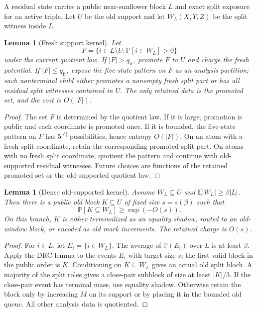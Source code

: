 \documentclass[11pt]{article}
\newtheorem{lemma}[theorem]{Lemma}
\theoremstyle{remark}
\newcommand{\E}{\mathbb E}
\newcommand{\Prob}{\mathbb P}
\newcommand{\fr}{\mathrm{fr}}
\begin{document}
A residual state carries a public near-sunflower block $L$ and exact split exposure for an active triple.  Let $U$ be the old support and let $W_L(X,Y,Z)$ be the split witness inside $L$.

\begin{lemma}[Fresh support kernel]\label{lem:appendix-fresh-kernel}
Let
\[
        F=\{i\in L\setminus U:\Prob[i\in W_L]>0\}
\]
under the current quotient law.  If $|F|>q_{\fr}$, promote $F$ to $U$ and charge the fresh potential.  If $|F|\le q_{\fr}$, expose the five-state pattern on $F$ as an analysis partition; each nonterminal child either promotes a nonempty fresh split part or has all residual split witnesses contained in $U$.  The only retained data is the promoted set, and the cost is $O(|F|)$.
\end{lemma}

\begin{proof}
The set $F$ is determined by the quotient law.  If it is large, promotion is public and each coordinate is promoted once.  If it is bounded, the five-state pattern on $F$ has $5^{|F|}$ possibilities, hence entropy $O(|F|)$.  On an atom with a fresh split coordinate, retain the corresponding promoted split part.  On atoms with no fresh split coordinate, quotient the pattern and continue with old-supported residual witnesses.  Future choices are functions of the retained promoted set or the old-supported quotient law.
\end{proof}

\begin{lemma}[Dense old-supported kernel]\label{lem:appendix-dense-old}
Assume $W_L\subseteq U$ and $\E|W_L|\ge \beta |L|$.  Then there is a public old block $K\subseteq U$ of fixed size $s=s(\beta)$ such that
\[
        \Prob[K\subseteq W_L]\ge \exp(-O(s)).
\]
On this branch, $K$ is either terminalized as an equality shadow, routed to an old-window block, or encoded as old mark increments.  The retained charge is $O(s)$.
\end{lemma}

\begin{proof}
For $i\in L$, let $E_i=\{i\in W_L\}$.  The average of $\Prob(E_i)$ over $L$ is at least $\beta$.  Apply the DRC lemma to the events $E_i$ with target size $s$; the first valid block in the public order is $K$.  Conditioning on $K\subseteq W_L$ gives an actual old split block.  A majority of the split roles gives a close-pair subblock of size at least $|K|/3$.  If the close-pair event has terminal mass, use equality shadow.  Otherwise retain the block only by increasing $M$ on its support or by placing it in the bounded old queue.  All other analysis data is quotiented.
\end{proof}
\end{document}
